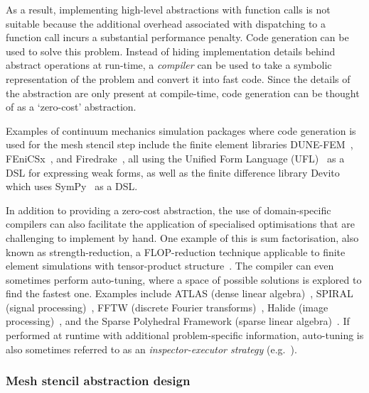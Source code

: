 \documentclass[thesis]{subfiles}
\begin{document}
As a result, implementing high-level abstractions with function calls is not suitable because the additional overhead associated with dispatching to a function call incurs a substantial performance penalty.
Code generation can be used to solve this problem.
Instead of hiding implementation details behind abstract operations at run-time, a \emph{compiler} can be used to take a symbolic representation of the problem and convert it into fast code.
Since the details of the abstraction are only present at compile-time, code generation can be thought of as a `zero-cost' abstraction.

Examples of continuum mechanics simulation packages where code generation is used for the mesh stencil step include the finite element libraries DUNE-FEM~\cite{dednerGenericInterfaceParallel2010}, FEniCSx~\cite{barattaDOLFINxNextGeneration2023}, and Firedrake~\cite{FiredrakeUserManual}, all using the Unified Form Language (UFL)~\cite{alnaesUnifiedFormLanguage2014a} as a DSL for expressing weak forms, as well as the finite difference library Devito~\cite{devito-api,luporiniArchitecturePerformanceDevito2020} which uses SymPy~\cite{10.7717/peerj-cs.103} as a DSL.

In addition to providing a zero-cost abstraction, the use of domain-specific compilers can also facilitate the application of specialised optimisations that are challenging to implement by hand.
One example of this is sum factorisation, also known as strength-reduction, a FLOP-reduction technique applicable to finite element simulations with tensor-product structure~\cite{lamReordering1997,homolyaExposingExploitingStructure2017}.
The compiler can even sometimes perform auto-tuning, where a space of possible solutions is explored to find the fastest one.
Examples include ATLAS (dense linear algebra)~\cite{whaleyAutomatedEmpiricalOptimizations2001}, SPIRAL (signal processing)~\cite{puschelSPIRALCodeGeneration2005}, FFTW (discrete Fourier transforms)~\cite{frigoDesignImplementationFFTW32005}, Halide (image processing)~\cite{ragan-kelleyHalideLanguageCompiler2013}, and the Sparse Polyhedral Framework (sparse linear algebra)~\cite{stroutSparsePolyhedralFramework2018}.
If performed at runtime with additional problem-specific information, auto-tuning is also sometimes referred to as an \emph{inspector-executor strategy} (e.g.~\cite{baxter1989run,kriegerLoopChainingProgramming2013}).

\subsubsection{Mesh stencil abstraction design}
\end{document}
